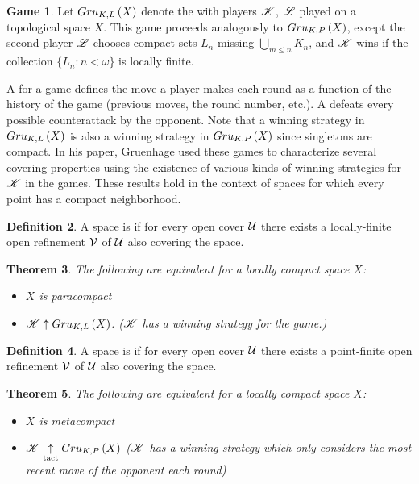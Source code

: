 \documentclass{amsart}
\newtheorem{theorem}{Theorem}[section]
\theoremstyle{definition}
\newtheorem{definition}[theorem]{Definition}
\newtheorem{game}[theorem]{Game}
\begin{document}
\begin{game}
  Let $Gru_{K,L}\left({X}\right)$ denote the 
  with players $\mathscr{K}$, $\mathscr{L}$ played on a topological space \(X\).
  This game proceeds analogously to
  $Gru_{K,P}\left({X}\right)$, except the second player $\mathscr{L}$ chooses compact sets $L_n$
  missing $\bigcup_{m\leq n}K_n$,
  and $\mathscr{K}$ wins if the collection $\{L_n:n<\omega\}$ is locally finite.
\end{game}

A  for a game defines the move a player makes each round as
a function of the history of the game (previous moves, the round number, etc.).
A  defeats every possible counterattack by the
opponent.
Note that a winning strategy in \(Gru_{K,L}\left({X}\right)\) is also a winning strategy
in \(Gru_{K,P}\left({X}\right)\) since singletons are compact.
In his paper, Gruenhage used these games to characterize several covering
properties using the existence of various kinds of winning strategies for
\(\mathscr{K}\) in the games. These results hold in the context of
 spaces for which every point has a compact neighborhood.

\begin{definition}
  A space is  if for every open cover $\mathcal{U}$ there exists a
  locally-finite open refinement $\mathcal{V}$ of $\mathcal{U}$ also covering the space.
\end{definition}

\begin{theorem} \cite[Theorem 5]{MR858337}
  The following are equivalent for a locally compact space $X$:
    \begin{itemize}
      \item $X$ is paracompact
      \item $\mathscr{K} \uparrow Gru_{K,L}\left({X}\right)$. (\(\mathscr{K}\) has a winning strategy
      for the game.)
    \end{itemize}
\end{theorem}

\begin{definition}
  A space is  if for every open cover $\mathcal{U}$ there exists a
  point-finite open refinement $\mathcal{V}$ of $\mathcal{U}$ also covering the space.
\end{definition}

\begin{theorem} \cite[Theorem 2]{MR858337}
  The following are equivalent for a locally compact space $X$:
    \begin{itemize}
      \item $X$ is metacompact
      \item $\mathscr{K} \underset{\text{tact}}{\uparrow} Gru_{K,P}\left({X}\right)$ (\(\mathscr{K}\) has a 
      winning strategy which only considers the most recent move of
      the opponent each round)
    \end{itemize}
\end{theorem}
\end{document}
